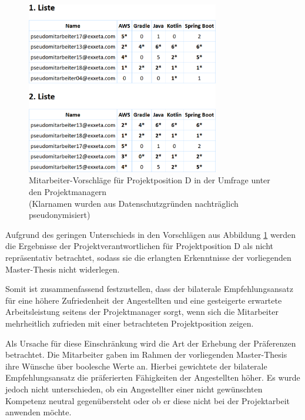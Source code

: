 \begin{figure}[h]
	\centering
	\includegraphics[width=0.75\textwidth]{gfx/projektposition-d.png}
	\caption[Mitarbeiter-Vorschläge für Projektposition D in der Umfrage unter den Projektmanagern]{Mitarbeiter-Vorschläge für Projektposition D in der Umfrage unter den Projektmanagern\\
	(Klarnamen wurden aus Datenschutzgründen nachträglich pseudonymisiert)}
	\label{fig:diskussion:interpretation:abb2}
\end{figure}

Aufgrund des geringen Unterschieds in den Vorschlägen aus Abbildung \ref{fig:diskussion:interpretation:abb2} werden die Ergebnisse der Projektverantwortlichen für Projektposition D als nicht repräsentativ betrachtet, sodass sie die erlangten Erkenntnisse der vorliegenden Master-Thesis nicht widerlegen.

Somit ist zusammenfassend festzustellen, dass der bilaterale Empfehlungsansatz für eine höhere Zufriedenheit der Angestellten und eine gesteigerte erwartete Arbeitsleistung seitens der Projektmanager sorgt, wenn sich die Mitarbeiter mehrheitlich zufrieden mit einer betrachteten Projektposition zeigen.

Als Ursache für diese Einschränkung wird die Art der Erhebung der Präferenzen betrachtet. Die Mitarbeiter gaben im Rahmen der vorliegenden Master-Thesis ihre Wünsche über boolesche Werte an. Hierbei gewichtete der bilaterale Empfehlungsansatz die präferierten Fähigkeiten der Angestellten höher. Es wurde jedoch nicht unterschieden, ob ein Angestellter einer nicht gewünschten Kompetenz neutral gegenübersteht oder ob er diese nicht bei der Projektarbeit anwenden möchte.

